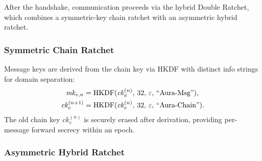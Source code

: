 \documentclass[preprint,12pt]{elsarticle}
\theoremstyle{definition}
\newcommand{\tech}[1]{\textnormal{#1}}
\newcommand{\domain}[1]{\textnormal{``#1''}}
\newcommand{\HKDF}{\tech{HKDF}}
\newcommand{\ck}{\mathit{ck}}
\newcommand{\mk}{\mathit{mk}}
\begin{document}
After the handshake, communication proceeds via the hybrid Double Ratchet, which combines a symmetric-key chain ratchet with an asymmetric hybrid ratchet.

\subsubsection{Symmetric Chain Ratchet}

Message keys are derived from the chain key via HKDF with distinct info strings for domain separation:
\begin{align}
  \mk_{e,n} &= \HKDF(\ck_e^{(n)},\, 32,\, \varepsilon,\, \domain{Aura-Msg}), \label{eq:msg-key} \\
  \ck_e^{(n+1)} &= \HKDF(\ck_e^{(n)},\, 32,\, \varepsilon,\, \domain{Aura-Chain}). \label{eq:chain-key}
\end{align}
The old chain key $\ck_e^{(n)}$ is securely erased after derivation, providing per-message forward secrecy within an epoch.

\subsubsection{Asymmetric Hybrid Ratchet}
\end{document}

